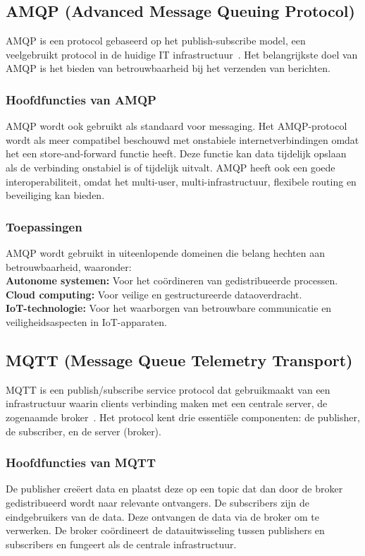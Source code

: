 \subsection{AMQP (Advanced Message Queuing Protocol)} 
AMQP is een protocol gebaseerd op het publish-subscribe model, een veelgebruikt protocol in de huidige IT infrastructuur~\autocite{Adiono2020}.
Het belangrijkste doel van AMQP is het bieden van betrouwbaarheid bij het verzenden van berichten.  

\subsubsection{Hoofdfuncties van AMQP}
AMQP wordt ook gebruikt als standaard voor messaging. 
Het AMQP-protocol wordt als meer compatibel beschouwd met onstabiele internetverbindingen omdat het een store-and-forward functie heeft. 
Deze functie kan data tijdelijk opslaan als de verbinding onstabiel is of tijdelijk uitvalt. 
AMQP heeft ook een goede interoperabiliteit, omdat het multi-user, multi-infrastructuur, flexibele routing en beveiliging kan bieden.
 
\subsubsection{Toepassingen}
AMQP wordt gebruikt in uiteenlopende domeinen die belang hechten aan betrouwbaarheid, waaronder:
\\
\textbf{Autonome systemen:} Voor het coördineren van gedistribueerde processen. \\ 
\textbf{Cloud computing:} Voor veilige en gestructureerde dataoverdracht.  \\
\textbf{IoT-technologie:} Voor het waarborgen van betrouwbare communicatie en veiligheidsaspecten in IoT-apparaten.

\subsection{MQTT (Message Queue Telemetry Transport)}
MQTT is een publish/subscribe service protocol dat gebruikmaakt van een infrastructuur waarin clients verbinding maken met een centrale server, de zogenaamde broker~\autocite{Usmani2021}. 
Het protocol kent drie essentiële componenten: de publisher, de subscriber, en de server (broker).

\subsubsection{Hoofdfuncties van MQTT}
De publisher creëert data en plaatst deze op een topic dat dan door de broker gedistribueerd wordt naar relevante ontvangers.
De subscribers zijn de eindgebruikers van de data. Deze ontvangen de data via de broker om te verwerken.
De broker coördineert de datauitwisseling tussen publishers en subscribers en fungeert als de centrale infrastructuur.

